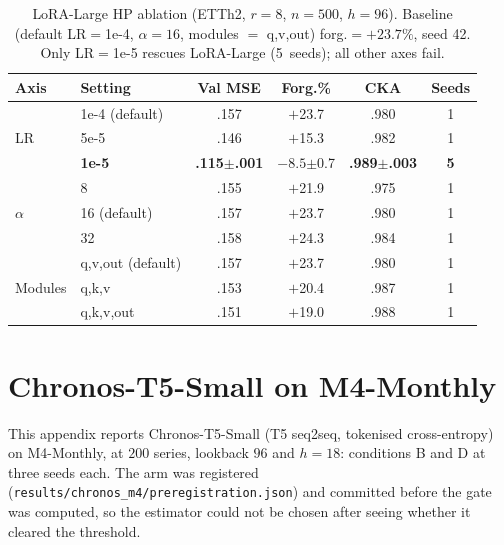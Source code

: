 \begin{table}[ht]
\centering
\caption{LoRA-Large HP ablation (ETTh2, $r{=}8$, $n{=}500$, $h{=}96$).
Baseline (default LR$=$1e-4, $\alpha{=}16$, modules $=$ q,v,out) forg.$=+23.7\%$, seed 42.
Only LR$=$1e-5 rescues LoRA-Large (5~seeds); all other axes fail.}
\label{tab:lora_large_hp}
\small
\begin{tabular}{llcccc}
\toprule
Axis & Setting & Val MSE & Forg.\% & CKA & Seeds \\
\midrule
\multirow{3}{*}{LR} & 1e-4 (default) & .157 & $+$23.7 & .980 & 1 \\
                    & 5e-5           & .146 & $+$15.3 & .982 & 1 \\
                    & \textbf{1e-5}  & \textbf{.115{\tiny$\pm$.001}} & $\mathbf{-8.5}${\tiny$\pm$0.7} & \textbf{.989{\tiny$\pm$.003}} & \textbf{5} \\
\midrule
\multirow{3}{*}{$\alpha$} & 8  & .155 & $+$21.9 & .975 & 1 \\
                           & 16 (default) & .157 & $+$23.7 & .980 & 1 \\
                           & 32 & .158 & $+$24.3 & .984 & 1 \\
\midrule
\multirow{3}{*}{Modules} & q,v,out (default)  & .157 & $+$23.7 & .980 & 1 \\
                         & q,k,v              & .153 & $+$20.4 & .987 & 1 \\
                         & q,k,v,out          & .151 & $+$19.0 & .988 & 1 \\
\bottomrule
\end{tabular}
\end{table}

\section{Chronos-T5-Small on M4-Monthly}
\label{app:chronos_detail}

This appendix reports Chronos-T5-Small (T5 seq2seq, tokenised cross-entropy) on
M4-Monthly, at $200$ series, lookback $96$ and $h{=}18$: conditions B and D at
three seeds each.  The arm was registered
(\texttt{results/chronos\_m4/preregistration.json}) and committed before the gate
was computed, so the estimator could not be chosen after seeing whether it cleared
the threshold.


